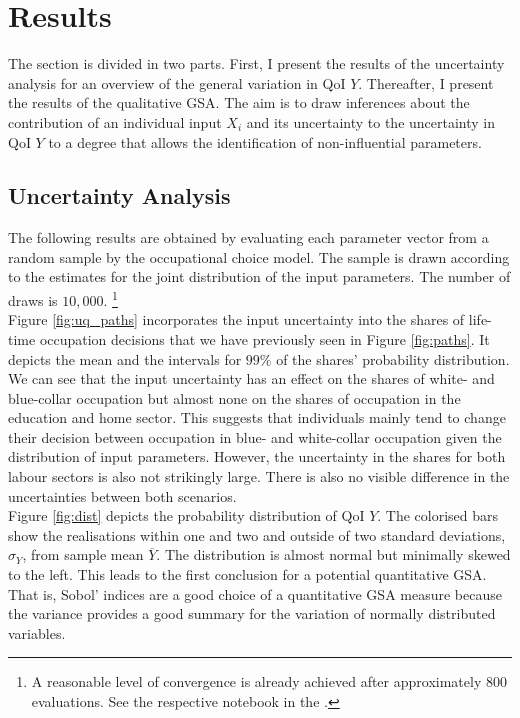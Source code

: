 \documentclass[a4paper,12pt]{article}
\begin{document}
\newpage %

\section{Results}

The section is divided in two parts. First, I present the results of the uncertainty analysis for an overview of the general variation in QoI $Y$. Thereafter, I present the results of the qualitative GSA. The aim is to draw inferences about the contribution of an individual input $X_i$ and its uncertainty to the uncertainty in QoI $Y$ to a degree that allows the identification of non-influential parameters.

\subsection{Uncertainty Analysis}
The following results are obtained by evaluating each parameter vector from a random sample by the occupational choice model. The sample is drawn according to the estimates for the joint distribution of the input parameters. The number of draws is $10,000$. \footnote{A reasonable level of convergence is already achieved after approximately 800 evaluations. See the respective notebook in the .}\\

\noindent
Figure \ref{fig:uq_paths} incorporates the input uncertainty into the shares of life-time occupation decisions that we have previously seen in Figure \ref{fig:paths}. It depicts the mean and the intervals for $99\%$ of the shares' probability distribution. We can see that the input uncertainty has an effect on the shares of white- and blue-collar occupation but almost none on the shares of occupation in the education and home sector. This suggests that individuals mainly tend to change their decision between occupation in blue- and white-collar occupation given the distribution of input parameters. However, the uncertainty in the shares for both labour sectors is also not strikingly large. There is also no visible difference in the uncertainties between both scenarios.\\


\noindent
Figure \ref{fig:dist} depicts the probability distribution of QoI $Y$. The colorised bars show the realisations within one and two and outside of two standard deviations, $\sigma_Y$, from sample mean $\overline{Y}$.  The distribution is almost normal but minimally skewed to the left. This leads to the first conclusion for a potential quantitative GSA. That is, Sobol' indices are a good choice of a quantitative GSA measure because the variance provides a good summary for the variation of normally distributed variables.\\
\end{document}
